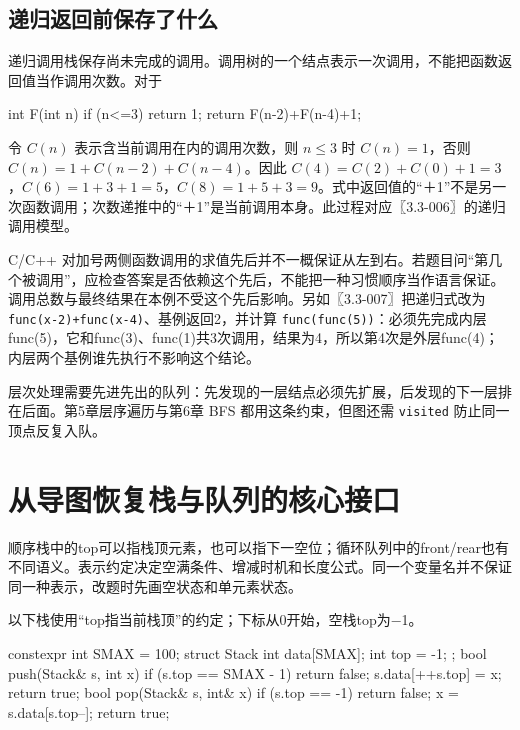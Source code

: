 \subsection{递归返回前保存了什么}\label{DS03-detail3}

递归调用栈保存尚未完成的调用。调用树的一个结点表示一次调用，不能把函数返回值当作调用次数。对于

\begin{codeblock}[language=C]
int F(int n) {
    if (n<=3) return 1;
    return F(n-2)+F(n-4)+1;
}
\end{codeblock}

令 \(C(n)\) 表示含当前调用在内的调用次数，则 \(n\le3\) 时 \(C(n)=1\)，否则 \(C(n)=1+C(n-2)+C(n-4)\)。因此 \(C(4)=C(2)+C(0)+1=3\)，\(C(6)=1+3+1=5\)，\(C(8)=1+5+3=9\)。式中返回值的``＋1''不是另一次函数调用；次数递推中的``＋1''是当前调用本身。此过程对应〖3.3-006〗的递归调用模型。

C/C++ 对加号两侧函数调用的求值先后并不一概保证从左到右。若题目问``第几个被调用''，应检查答案是否依赖这个先后，不能把一种习惯顺序当作语言保证。调用总数与最终结果在本例不受这个先后影响。另如〖3.3-007〗把递归式改为 \texttt{func(\allowbreak{}x-2)\allowbreak{}+\allowbreak{}func(\allowbreak{}x-4)\allowbreak{}}、基例返回2，并计算 \texttt{func(\allowbreak{}func(\allowbreak{}5)\allowbreak{})\allowbreak{}}：必须先完成内层func(5)，它和func(3)、func(1)共3次调用，结果为4，所以第4次是外层func(4)；内层两个基例谁先执行不影响这个结论。

层次处理需要先进先出的队列：先发现的一层结点必须先扩展，后发现的下一层排在后面。第5章层序遍历与第6章 BFS 都用这条约束，但图还需 \texttt{visited} 防止同一顶点反复入队。

\section{从导图恢复栈与队列的核心接口}\label{DS03-code}

\begin{definition}

顺序栈中的top可以指栈顶元素，也可以指下一空位；循环队列中的front/rear也有不同语义。表示约定决定空满条件、增减时机和长度公式。同一个变量名并不保证同一种表示，改题时先画空状态和单元素状态。

\end{definition}

以下栈使用“top指当前栈顶”的约定；下标从0开始，空栈top为\ensuremath{-}1。

\begin{codeblock}[language=C++]
constexpr int SMAX = 100;
struct Stack { int data[SMAX]; int top = -1; };
bool push(Stack& s, int x) {
    if (s.top == SMAX - 1) return false;
    s.data[++s.top] = x;
    return true;
}
bool pop(Stack& s, int& x) {
    if (s.top == -1) return false;
    x = s.data[s.top--];
    return true;
}
\end{codeblock}

